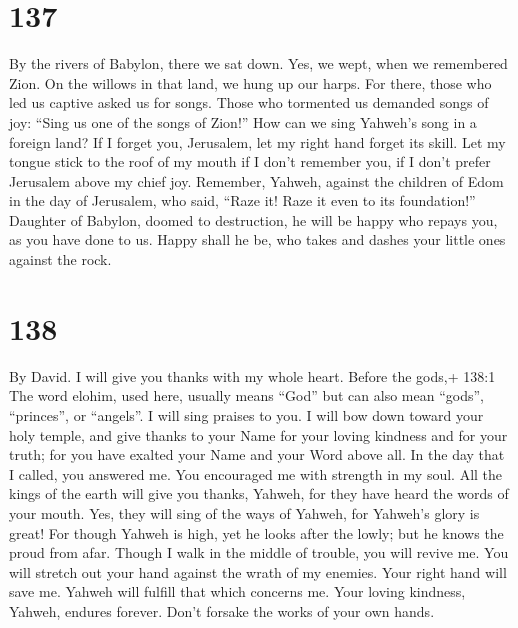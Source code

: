\hypertarget{section-127}{%
\section{137}\label{section-127}}

 By the rivers of Babylon, there we sat down. Yes, we wept,
when we remembered Zion.  On the willows in that land, we
hung up our harps.  For there, those who led us captive
asked us for songs. Those who tormented us demanded songs of joy: ``Sing
us one of the songs of Zion!''  How can we sing Yahweh's
song in a foreign land?  If I forget you, Jerusalem, let my
right hand forget its skill.  Let my tongue stick to the
roof of my mouth if I don't remember you, if I don't prefer Jerusalem
above my chief joy.  Remember, Yahweh, against the children
of Edom in the day of Jerusalem, who said, ``Raze it! Raze it even to
its foundation!''  Daughter of Babylon, doomed to
destruction, he will be happy who repays you, as you have done to us.
 Happy shall he be, who takes and dashes your little ones
against the rock.

\hypertarget{section-128}{%
\section{138}\label{section-128}}

By David.  I will give you thanks with my whole heart.
Before the gods,+ 138:1 The word elohim, used here, usually means
``God'' but can also mean ``gods'', ``princes'', or ``angels''. I will
sing praises to you.  I will bow down toward your holy
temple, and give thanks to your Name for your loving kindness and for
your truth; for you have exalted your Name and your Word above all.
 In the day that I called, you answered me. You encouraged
me with strength in my soul.  All the kings of the earth
will give you thanks, Yahweh, for they have heard the words of your
mouth.  Yes, they will sing of the ways of Yahweh, for
Yahweh's glory is great!  For though Yahweh is high, yet he
looks after the lowly; but he knows the proud from afar. 
Though I walk in the middle of trouble, you will revive me. You will
stretch out your hand against the wrath of my enemies. Your right hand
will save me.  Yahweh will fulfill that which concerns me.
Your loving kindness, Yahweh, endures forever. Don't forsake the works
of your own hands.

